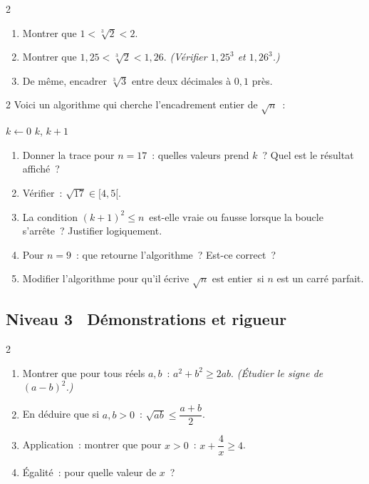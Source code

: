 \begin{exo}{2}
\begin{enumerate}
  \item Montrer que $1 < \sqrt[3]{2} < 2$.
  \item Montrer que $1{,}25 < \sqrt[3]{2} < 1{,}26$.
        \emph{(V\'erifier $1{,}25^3$ et $1{,}26^3$.)}
  \item De m\^eme, encadrer $\sqrt[3]{3}$ entre deux d\'ecimales \`a $0{,}1$ pr\`es.
\end{enumerate}
\end{exo}

\begin{exo}{2}
Voici un algorithme qui cherche l'encadrement entier de $\sqrt{n}$~:

\begin{algorithm}[H]
\caption{Encadrement entier de $\sqrt{n}$}
$k \leftarrow 0$\;
\Afficher $k$, $k+1$
\end{algorithm}

\begin{enumerate}
  \item Donner la trace pour $n=17$~: quelles valeurs prend $k$~?
        Quel est le r\'esultat affich\'e~?
  \item V\'erifier~: $\sqrt{17}\in[4,5[$.
  \item La condition \og$(k+1)^2\leq n$\fg\ est-elle vraie ou fausse
        lorsque la boucle s'arr\^ete~? Justifier logiquement.
  \item Pour $n=9$~: que retourne l'algorithme~? Est-ce correct~?
  \item Modifier l'algorithme pour qu'il \'ecrive
        \og$\sqrt{n}$ est entier\fg\ si $n$ est un carr\'e parfait.
\end{enumerate}
\end{exo}

\subsection*{\quad Niveau 3 \textemdash\ D\'emonstrations et rigueur}

\begin{exo}{2}
\begin{enumerate}
  \item Montrer que pour tous r\'eels $a,b$~: $a^2+b^2 \geq 2ab$.
        \emph{(\'Etudier le signe de $(a-b)^2$.)}
  \item En d\'eduire que si $a,b > 0$~: $\sqrt{ab} \leq \dfrac{a+b}{2}$.
  \item Application~: montrer que pour $x>0$~: $x + \dfrac{4}{x} \geq 4$.
  \item \'Egalit\'e~: pour quelle valeur de $x$~?
\end{enumerate}
\end{exo}

